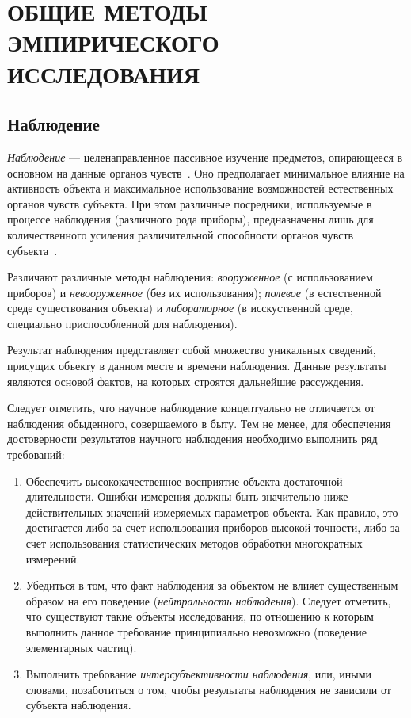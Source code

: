 \section[Общие методы эмпирического исследования]{%
  ОБЩИЕ МЕТОДЫ ЭМПИРИЧЕСКОГО \\
  ИССЛЕДОВАНИЯ
}

\subsection{Наблюдение}

\emph{Наблюдение} --- целенаправленное пассивное изучение предметов,
опирающееся в основном на данные органов чувств~\cite{nekrasov2010}.
Оно предполагает минимальное влияние на активность объекта и максимальное
использование возможностей естественных органов чувств субъекта.
При этом различные посредники, используемые в процессе наблюдения
(различного рода приборы), предназначены лишь для количественного усиления
различительной способности органов чувств субъекта~\cite{moiseev2004}.

Различают различные методы наблюдения:
\emph{вооруженное} (с использованием приборов) и \emph{невооруженное} (без их использования);
\emph{полевое} (в естественной среде существования объекта) и
\emph{лабораторное} (в исскуственной среде, специально приспособленной для наблюдения).

Результат наблюдения представляет собой множество уникальных сведений,
присущих объекту в данном месте и времени наблюдения.
Данные результаты являются основой фактов, на которых строятся дальнейшие рассуждения.

Следует отметить, что научное наблюдение концептуально не отличается
от наблюдения обыденного, совершаемого в быту.
Тем не менее, для обеспечения достоверности результатов научного наблюдения
необходимо выполнить ряд требований:
\begin{enumerate}
\item Обеспечить высококачественное восприятие объекта достаточной длительности.
  Ошибки измерения должны быть значительно ниже действительных
  значений измеряемых параметров объекта.
  Как правило, это достигается либо за счет использования приборов высокой точности,
  либо за счет использования статистических методов обработки многократных измерений.
\item Убедиться в том, что факт наблюдения за объектом не влияет существенным
  образом на его поведение (\emph{нейтральность наблюдения}).
  Следует отметить, что существуют такие объекты исследования,
  по отношению к которым выполнить данное требование принципиально невозможно
  (поведение элементарных частиц).
\item Выполнить требование \emph{интерсубъективности наблюдения}, или, иными словами,
  позаботиться о том, чтобы результаты наблюдения не зависили от субъекта наблюдения.
\end{enumerate}

